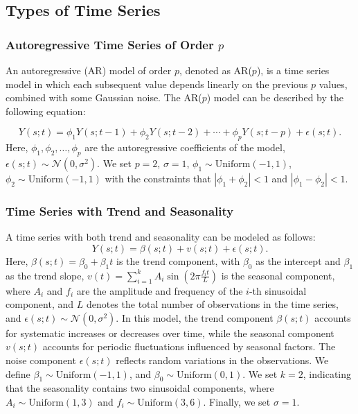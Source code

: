 \documentclass[11pt]{article}
\begin{document}
\subsection{Types of Time Series}
\subsubsection*{Autoregressive Time Series of Order $p$}
An autoregressive (AR) model of order $p$, denoted as AR($p$), is a time series model in which each subsequent value depends linearly on the previous $p$ values, combined with some Gaussian noise. The AR($p$) model can be described by the following equation:

\begin{equation}
	Y(s;t) = \phi_1 Y(s;t-1) + \phi_2 Y(s;t-2) + \cdots + \phi_p Y(s;t-p) + \epsilon(s;t).
\end{equation}
Here, $\phi_1, \phi_2, \dots, \phi_p$ are the autoregressive coefficients of the model, $\epsilon(s;t) \sim \mathcal{N}(0, \sigma^2)$. We set $p=2$, $\sigma=1$, $\phi_1\sim \mathrm{Uniform}(-1,1)$, $\phi_2 \sim \mathrm{Uniform(-1,1)}$ with the constraints that $|\phi_1+\phi_2|<1$ and $|\phi_1-\phi_2|<1$.

\subsubsection*{Time Series with Trend and Seasonality}
A time series with both trend and seasonality can be modeled as follows:
\begin{equation}
	Y(s;t) = \beta(s;t) + v(s;t) + \epsilon(s;t).
\end{equation}
Here, $\beta(s;t) = \beta_0 + \beta_1 t$ is the trend component, with $\beta_0$ as the intercept and $\beta_1$ as the trend slope, $v(t) = \sum_{i=1}^k A_i \sin\left(2 \pi \frac{f_i t}{L}\right)$ is the seasonal component, where $A_i$ and $f_i$ are the amplitude and frequency of the $i$-th sinusoidal component, and $L$ denotes the total number of observations in the time series, and $\epsilon(s;t) \sim \mathcal{N}(0, \sigma^2)$. In this model, the trend component $\beta(s;t)$ accounts for systematic increases or decreases over time, while the seasonal component $v(s;t)$ accounts for periodic fluctuations influenced by seasonal factors. The noise component $\epsilon(s;t)$ reflects random variations in the observations. We define $\beta_1 \sim \mathrm{Uniform}(-1, 1)$, and $\beta_0 \sim \mathrm{Uniform}(0, 1)$. We set $k = 2$, indicating that the seasonality contains two sinusoidal components, where $A_i \sim \mathrm{Uniform}(1, 3)$ and $f_i \sim \mathrm{Uniform}(3, 6)$. Finally, we set $\sigma=1$.
\end{document}
